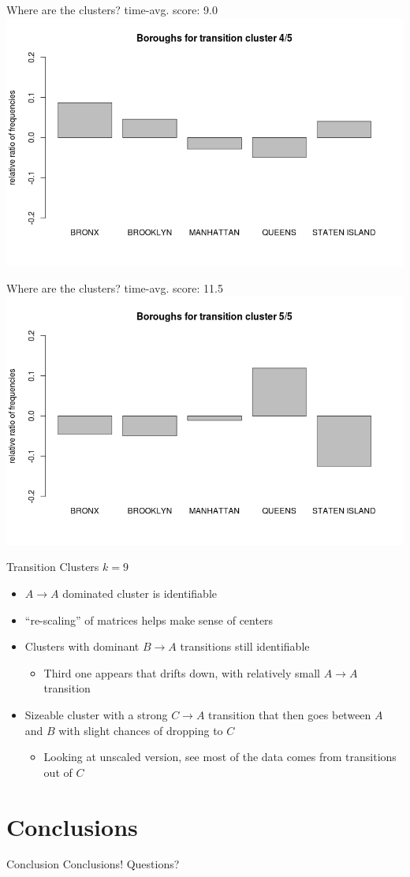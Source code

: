 \documentclass[12pt]{beamer}
\begin{document}
\begin{frame}{Where are the clusters?}
time-avg. score: 9.0
\includegraphics[width=\textwidth]{plots/boro_trans_4}
\end{frame}
\begin{frame}{Where are the clusters?}
time-avg. score: 11.5
\includegraphics[width=\textwidth]{plots/boro_trans_5}
\end{frame}


\begin{frame}{Transition Clusters}
\vfill
$k=9$
\begin{itemize}
	\item $A \rightarrow A$ dominated cluster is identifiable
	\item ``re-scaling'' of matrices helps make sense of centers
	\item Clusters with dominant $B \rightarrow A$ transitions still identifiable
	\begin{itemize}
		\item Third one appears that drifts down, with relatively small 
		$A \rightarrow A$ transition
	\end{itemize}
	\item Sizeable cluster with a strong $C \rightarrow A$ transition that
	then goes between $A$ and $B$ with slight chances of dropping to $C$
	\begin{itemize}
		\item Looking at unscaled version, see most of the data comes from
		transitions out of $C$
	\end{itemize}
\end{itemize}
\vfill
\end{frame}

\section{Conclusions}
\begin{frame}{Conclusion}
\vfill
Conclusions!
\vfill
Questions?
\vfill
\end{frame}
\end{document}
